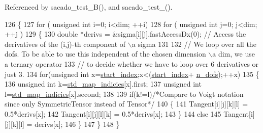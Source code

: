 Referenced by sacado\+\_\+test\+\_\+B(), and sacado\+\_\+test\+\_().


\begin{DoxyCode}
126     \{
127         \textcolor{keywordflow}{for} ( \textcolor{keywordtype}{unsigned} \textcolor{keywordtype}{int} i=0; i<dim; ++i)
128             \textcolor{keywordflow}{for} ( \textcolor{keywordtype}{unsigned} \textcolor{keywordtype}{int} j=0; j<dim; ++j )
129             \{
130                 \textcolor{keywordtype}{double} *derivs = &sigma[i][j].fastAccessDx(0); \textcolor{comment}{// Access the derivatives of the (i,j)-th
       component of \(\backslash\)a sigma}
131                 
132                 \textcolor{comment}{// We loop over all the dofs. To be able to use this independent of the chosen dimension \(\backslash\)a
       dim, we use a ternary operator}
133                 \textcolor{comment}{// to decide whether we have to loop over 6 derivatives or just 3.}
134                 \textcolor{keywordflow}{for}(\textcolor{keywordtype}{unsigned} \textcolor{keywordtype}{int} x=\hyperlink{classSacado__Wrapper_1_1SymTensor_afe921e6044e4110fcfc848c52844d650}{start\_index};x<(\hyperlink{classSacado__Wrapper_1_1SymTensor_afe921e6044e4110fcfc848c52844d650}{start\_index}+
      \hyperlink{classSacado__Wrapper_1_1SymTensor_a733bc4b029ff8d067b48e7ce3ee7606b}{n\_dofs});++x)
135                 \{
136                     \textcolor{keywordtype}{unsigned} \textcolor{keywordtype}{int} k=\hyperlink{classSacado__Wrapper_1_1SymTensor_ae3b1c56cde3fc5c7805b618ef3d9de75}{std\_map\_indicies}[x].first;
137                     \textcolor{keywordtype}{unsigned} \textcolor{keywordtype}{int} l=\hyperlink{classSacado__Wrapper_1_1SymTensor_ae3b1c56cde3fc5c7805b618ef3d9de75}{std\_map\_indicies}[x].second;
138 
139                     \textcolor{keywordflow}{if}(k!=l)\textcolor{comment}{/*Compare to Voigt notation since only SymmetricTensor instead of Tensor*/}
140                     \{
141                         Tangent[i][j][k][l] = 0.5*derivs[x];
142                         Tangent[i][j][l][k] = 0.5*derivs[x];
143                     \}
144                     \textcolor{keywordflow}{else}
145                         Tangent[i][j][k][l] = derivs[x];
146                 \}
147             \}
148     \}
\end{DoxyCode}
